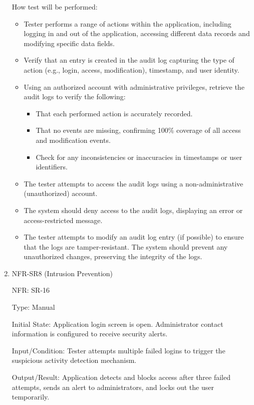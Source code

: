 \documentclass[12pt, titlepage]{article}
\begin{document}
\begin{enumerate}
  How test will be performed: 
  \begin{itemize}
    \item Tester performs a range of actions within the application, including
    logging in and out of the application, accessing different data records and
    modifying specific data fields.
    \item Verify that an entry is created in the audit log capturing the type of
    action (e.g., login, access, modification), timestamp, and user identity.
    \item Using an authorized account with administrative privileges, retrieve
    the audit logs to verify the following:
    \begin{itemize}
      \item That each performed action is accurately recorded.
      \item That no events are missing, confirming 100\% coverage of all access
      and modification events.
      \item Check for any inconsistencies or inaccuracies in timestamps or user
      identifiers.
    \end{itemize}
    \item The tester attempts to access the audit logs using a
    non-administrative (unauthorized) account.
    \item The system should deny access to the audit logs, displaying an error
    or access-restricted message.
    \item The tester attempts to modify an audit log entry (if possible) to
    ensure that the logs are tamper-resistant. The system should prevent any
    unauthorized changes, preserving the integrity of the logs.
  \end{itemize}

\item{NFR-SR8 (Intrusion Prevention)\\}
  
  NFR: SR-16
  
  Type: Manual
  
  Initial State: Application login screen is open. Administrator contact
  information is configured to receive security alerts.
  
  Input/Condition: Tester attempts multiple failed logins to trigger the
  suspicious activity detection mechanism.
  
  Output/Result:  Application detects and blocks access after three failed
  attempts, sends an alert to administrators, and locks out the user
  temporarily.


\end{enumerate}
\end{document}
